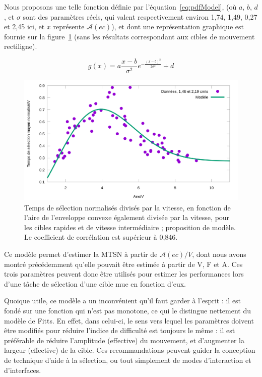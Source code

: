 	Nous proposons une telle fonction définie par l'équation~\ref{eq:pdfModel}, (où $a$, $b$, $d$, et $\sigma$ sont des paramètres réels, qui valent respectivement environ 1,74, 1,49, 0,27 et 2,45 ici, et $x$ représente $\mathcal{A}(ec)$), et dont une représentation graphique est fournie sur la figure~\ref{fig:timeVareaFit} (sans les résultats correspondant aux cibles de mouvement rectiligne).
	
	\begin{equation}
		g(x) = a\frac{x-b}{\sigma^{2}}e^{-\frac{(x-b)^{2}}{2\sigma^{2}} } + d
		\label{eq:pdfModel}
	\end{equation}
	
	\begin{figure}[!htbp]
		\centering
		\includegraphics[width=\textwidth]{figures/ch4/timeVareaFit}
		\caption[Temps de sélection/V en fonction de $\mathcal{A}(ec)/V$ et modèle]{Temps de sélection normalisés divisés par la vitesse, en fonction de l'aire de l'enveloppe convexe également divisée par la vitesse, pour les cibles rapides et de vitesse intermédiaire ; proposition de modèle. Le coefficient de corrélation est supérieur à 0,846.}
		\label{fig:timeVareaFit}
	\end{figure}
	
	Ce modèle permet d'estimer la MTSN à partir de $\mathcal{A}(ec)/V$, dont nous avons montré précédemment qu'elle pouvait être estimée à partir de V, F et A. Ces trois paramètres peuvent donc être utilisés pour estimer les performances lors d'une tâche de sélection d'une cible mue en fonction d'eux.
	
	Quoique utile, ce modèle a un inconvénient qu'il faut garder à l'esprit : il est fondé sur une fonction qui n'est pas monotone, ce qui le distingue nettement du modèle de Fitts. En effet, dans celui-ci, le sens vers lequel les paramètres doivent être modifiés pour réduire l'indice de difficulté est toujours le même : il est préférable de réduire l'amplitude (effective) du mouvement, et d'augmenter la largeur (effective) de la cible. Ces recommandations peuvent guider la conception de technique d'aide à la sélection, ou tout simplement de modes d'interaction et d'interfaces.
	
